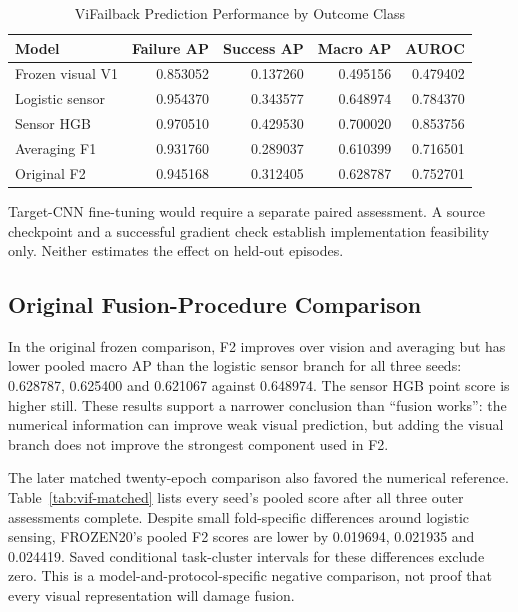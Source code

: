 \begin{table}[htbp]
\caption{ViFailback Prediction Performance by Outcome Class}\label{tab:vif-bothclass}
\centering\small

\begin{tabular}{lrrrr}\hline Model&Failure AP&Success AP&Macro AP&AUROC\\\hline
Frozen visual V1&0.853052&0.137260&0.495156&0.479402\\
Logistic sensor&0.954370&0.343577&0.648974&0.784370\\
Sensor HGB&0.970510&0.429530&0.700020&0.853756\\
Averaging F1&0.931760&0.289037&0.610399&0.716501\\
Original F2&0.945168&0.312405&0.628787&0.752701\\\hline
\end{tabular}
\end{table}

Target-CNN fine-tuning would require a separate paired assessment. A source checkpoint and a successful gradient check establish implementation feasibility only. Neither estimates the effect on held-out episodes.

\subsection{Original Fusion-Procedure Comparison}
In the original frozen comparison, F2 improves over vision and averaging but has lower pooled macro AP than the logistic sensor branch for all three seeds: 0.628787, 0.625400 and 0.621067 against 0.648974. The sensor HGB point score is higher still. These results support a narrower conclusion than ``fusion works'': the numerical information can improve weak visual prediction, but adding the visual branch does not improve the strongest component used in F2.

The later matched twenty-epoch comparison also favored the numerical reference. Table~\ref{tab:vif-matched} lists every seed's pooled score after all three outer assessments complete. Despite small fold-specific differences around logistic sensing, FROZEN20's pooled F2 scores are lower by 0.019694, 0.021935 and 0.024419. Saved conditional task-cluster intervals for these differences exclude zero. This is a model-and-protocol-specific negative comparison, not proof that every visual representation will damage fusion.

